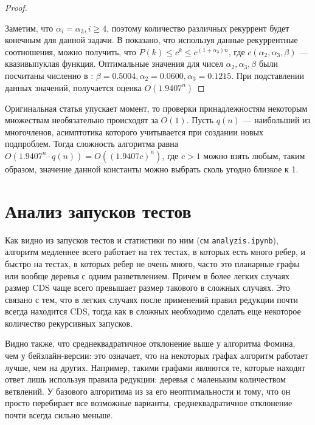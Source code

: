 \begin{proof}
\begin{enumerate}[label=\Alph*]
\begin{enumerate}
        \end{enumerate}
    \end{enumerate}
    Заметим, что \(\alpha_i = \alpha_3, i \ge 4\), поэтому количество различных рекуррент будет конечным для данной задачи. В \cite{eppstein_files_O_O_wtf} показано, что используя данные рекуррентные соотношения, можно получить, что \(P(k) \le c^k \le c^{(1 + \alpha_3)n}\), где \(c(\alpha_2, \alpha_3, \beta)\) --- квазивыпуклая функция. Оптимальные значения для чисел \(\alpha_2, \alpha_3, \beta\) были посчитаны численно в \cite{fomin}: \(\beta = 0.5004, \alpha_2 = 0.0600, \alpha_3 = 0.1215\). При подставлении данных значений, получается оценка \(O(1.9407^n)\)
\end{proof}

\begin{note}
    Оригинальная статья упускает момент, то проверки принадлежностям некоторым множествам необязательно происходят за \(O(1)\). Пусть \(q(n)\) --- наибольший из многочленов, асимптотика которого учитывается при создании новых подпроблем. Тогда сложность алгоритма равна \(O(1.9407^n\cdot q(n)) = O((1.9407c)^n)\), где \(c > 1\) можно взять любым, таким образом, значение данной константы можно выбрать сколь угодно близкое к 1.
\end{note}

\section{Анализ запусков тестов}

Как видно из запусков тестов и статистики по ним (см \texttt{analyzis.ipynb}), алгоритм медленнее всего работает на тех тестах, в которых есть много ребер, и быстро на тестах, в которых ребер не очень много, часто это планарные графы или вообще деревья с одним разветвлением. Причем в более легких случаях размер CDS чаще всего превышает размер такового в сложных случаях. Это связано с тем, что в легких случаях после применений правил редукции почти всегда находится CDS, тогда как в сложных необходимо сделать еще некоторое количество рекурсивных запусков.

Видно также, что среднеквадратичное отклонение выше у алгоритма Фомина, чем у бейзлайн-версии: это означает, что на некоторых графах алгоритм работает лучше, чем на других. Например, такими графами являются те, которые находят ответ лишь используя правила редукции: деревья с маленьким количеством ветвлений. У базового алгоритима из за его неоптимальности и тому, что он просто перебирает все возможные варианты, среднеквадратичное отклонение почти всегда сильно меньше.

